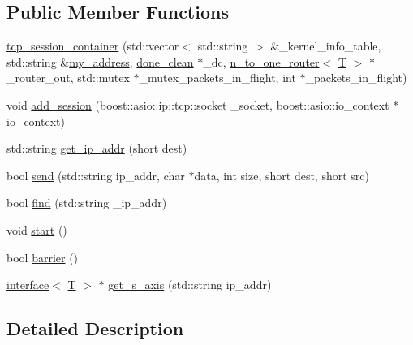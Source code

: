 \subsection*{Public Member Functions}
\begin{DoxyCompactItemize}
\item 
\hyperlink{classgalapagos_1_1net_1_1tcp__session__container_aff7a9dd66971b6812b9de462d588cc95}{tcp\+\_\+session\+\_\+container} (std\+::vector$<$ std\+::string $>$ \&\+\_\+kernel\+\_\+info\+\_\+table, std\+::string \&\hyperlink{test_8cpp_ad6c70ba8571527f1543822ce71b9a109}{my\+\_\+address}, \hyperlink{classgalapagos_1_1done__clean}{done\+\_\+clean} $\ast$\+\_\+dc, \hyperlink{classgalapagos_1_1n__to__one__router}{n\+\_\+to\+\_\+one\+\_\+router}$<$ \hyperlink{test_8cpp_a0658ceffa730c765d449bb3d21871b5f}{T} $>$ $\ast$\+\_\+router\+\_\+out, std\+::mutex $\ast$\+\_\+mutex\+\_\+packets\+\_\+in\+\_\+flight, int $\ast$\+\_\+packets\+\_\+in\+\_\+flight)
\item 
void \hyperlink{classgalapagos_1_1net_1_1tcp__session__container_ad1c38390da6df1bdd61d3c6801edd3c1}{add\+\_\+session} (boost\+::asio\+::ip\+::tcp\+::socket \+\_\+socket, boost\+::asio\+::io\+\_\+context $\ast$io\+\_\+context)
\item 
std\+::string \hyperlink{classgalapagos_1_1net_1_1tcp__session__container_a28211ba6529ca572b94169740416fb22}{get\+\_\+ip\+\_\+addr} (short dest)
\item 
bool \hyperlink{classgalapagos_1_1net_1_1tcp__session__container_a361a7a20068ba7341626863f05316602}{send} (std\+::string ip\+\_\+addr, char $\ast$data, int size, short dest, short src)
\item 
bool \hyperlink{classgalapagos_1_1net_1_1tcp__session__container_a176b5612e91affbb36ef59dcab13c011}{find} (std\+::string \+\_\+ip\+\_\+addr)
\item 
void \hyperlink{classgalapagos_1_1net_1_1tcp__session__container_aa180bb49b25f7987575dd00475ce00c5}{start} ()
\item 
bool \hyperlink{classgalapagos_1_1net_1_1tcp__session__container_a7c516c69d30b370dea139ede11d85187}{barrier} ()
\item 
\hyperlink{classgalapagos_1_1interface}{interface}$<$ \hyperlink{test_8cpp_a0658ceffa730c765d449bb3d21871b5f}{T} $>$ $\ast$ \hyperlink{classgalapagos_1_1net_1_1tcp__session__container_a6fb1b0b779f28ea29825eb6bd96fa66a}{get\+\_\+s\+\_\+axis} (std\+::string ip\+\_\+addr)
\end{DoxyCompactItemize}


\subsection{Detailed Description}

